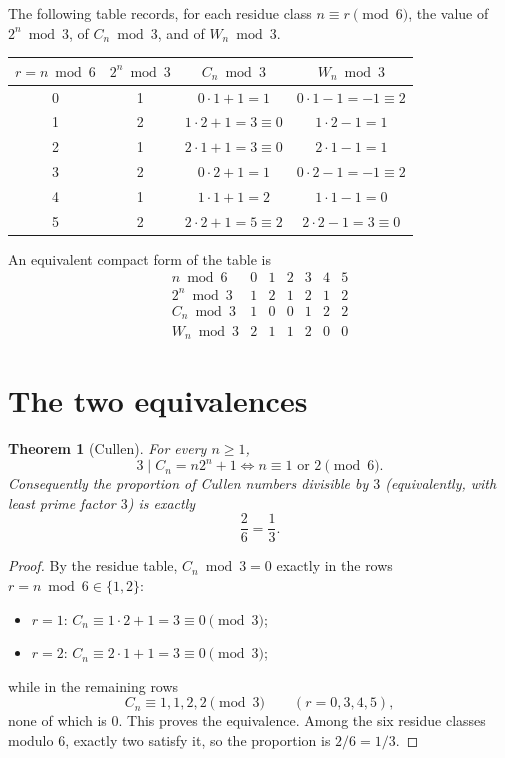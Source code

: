 \documentclass[11pt]{article}
\newtheorem{theorem}{Theorem}
\theoremstyle{definition}
\newcommand{\Cul}{C}
\newcommand{\Woo}{W}
\begin{document}
The following table records, for each residue class \(n\equiv r\pmod 6\), the
value of \(2^n\bmod 3\), of \(\Cul_n\bmod 3\), and of \(\Woo_n\bmod 3\).

\begin{center}
\begin{tabular}{c c c c}
\toprule
\(r = n\bmod 6\) & \(2^n \bmod 3\) & \(\Cul_n \bmod 3\) & \(\Woo_n \bmod 3\) \\
\midrule
0 & 1 & \(0\cdot 1+1 = 1\) & \(0\cdot 1-1 = -1\equiv 2\) \\
1 & 2 & \(1\cdot 2+1 = 3\equiv 0\) & \(1\cdot 2-1 = 1\) \\
2 & 1 & \(2\cdot 1+1 = 3\equiv 0\) & \(2\cdot 1-1 = 1\) \\
3 & 2 & \(0\cdot 2+1 = 1\) & \(0\cdot 2-1 = -1\equiv 2\) \\
4 & 1 & \(1\cdot 1+1 = 2\) & \(1\cdot 1-1 = 0\) \\
5 & 2 & \(2\cdot 2+1 = 5\equiv 2\) & \(2\cdot 2-1 = 3\equiv 0\) \\
\bottomrule
\end{tabular}
\end{center}

An equivalent compact form of the table is
\[
\begin{array}{c|cccccc}
n\bmod 6 & 0&1&2&3&4&5\\ \hline
2^n \bmod 3 & 1&2&1&2&1&2\\
\Cul_n \bmod 3 & 1&0&0&1&2&2\\
\Woo_n \bmod 3 & 2&1&1&2&0&0
\end{array}
\]

\section{The two equivalences}

\begin{theorem}[Cullen]\label{thm:cullen}
For every \(n\ge 1\),
\[
3\mid \Cul_n = n2^n+1
\iff
n\equiv 1 \text{ or } 2 \pmod 6 .
\]
Consequently the proportion of Cullen numbers divisible by \(3\) (equivalently,
with least prime factor \(3\)) is exactly
\[
\frac{2}{6}=\frac13 .
\]
\end{theorem}

\begin{proof}
By the residue table, \(\Cul_n \bmod 3 = 0\) exactly in the rows
\(r=n\bmod 6\in\{1,2\}\):
\begin{itemize}
\item \(r=1\): \(\Cul_n\equiv 1\cdot 2+1 = 3\equiv 0\pmod 3\);
\item \(r=2\): \(\Cul_n\equiv 2\cdot 1+1 = 3\equiv 0\pmod 3\);
\end{itemize}
while in the remaining rows
\[
\Cul_n\equiv 1,1,2,2 \pmod 3
\qquad (r=0,3,4,5),
\]
none of which is \(0\). This proves the equivalence. Among the six residue
classes modulo \(6\), exactly two satisfy it, so the proportion is
\(2/6=1/3\).
\end{proof}
\end{document}
